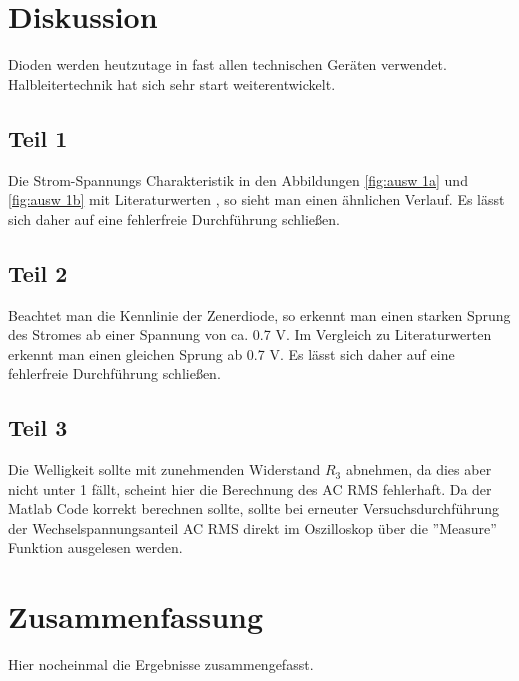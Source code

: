 \documentclass[12pt,a4paper,twoside]{article}
\begin{document}
\section{Diskussion} %
Dioden werden heutzutage in fast allen technischen Geräten verwendet. Halbleitertechnik hat sich sehr start weiterentwickelt. 

\subsection{Teil 1}
Die Strom-Spannungs Charakteristik in den Abbildungen \ref{fig:ausw 1a} und \ref{fig:ausw 1b} mit Literaturwerten \cite{diode}, so sieht man einen ähnlichen Verlauf. 
Es lässt sich daher auf eine fehlerfreie Durchführung schließen. 

\subsection{Teil 2}
Beachtet man die Kennlinie der Zenerdiode, so erkennt man einen starken Sprung des Stromes ab einer Spannung von ca. 0.7 V. 
Im Vergleich zu Literaturwerten \cite{zdiode} erkennt man einen gleichen Sprung ab 0.7 V. 
Es lässt sich daher auf eine fehlerfreie Durchführung schließen. 

\subsection{Teil 3}
Die Welligkeit sollte mit zunehmenden Widerstand $R_3$ abnehmen, da dies aber nicht unter 1 fällt, scheint hier die Berechnung des AC RMS fehlerhaft. 
Da der Matlab Code korrekt berechnen sollte, sollte bei erneuter Versuchsdurchführung der Wechselspannungsanteil AC RMS direkt im Oszilloskop über die ''Measure'' Funktion ausgelesen werden. 

\section{Zusammenfassung} %
Hier nocheinmal die Ergebnisse zusammengefasst. 
\end{document}
